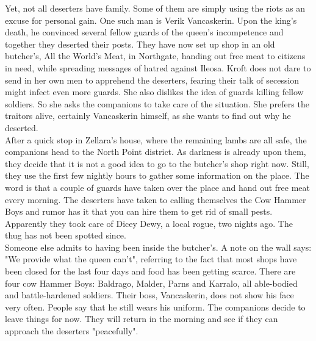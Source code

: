 Yet, not all deserters have family. Some of them are simply using the riots as an excuse for personal gain. One such man is Verik Vancaskerin. Upon the king's death, he convinced several fellow guards of the queen's incompetence and together they deserted their posts. They have now set up shop in an old butcher's, All the World's Meat, in Northgate, handing out free meat to citizens in need, while spreading messages of hatred against Ileosa. Kroft does not dare to send in her own men to apprehend the deserters, fearing their talk of secession might infect even more guards. She also dislikes the idea of guards killing fellow soldiers. So she asks the companions to take care of the situation. She prefers the traitors alive, certainly Vancaskerin himself, as she wants to find out why he deserted.\\

After a quick stop in Zellara's house, where the remaining lambs are all safe, the companions head to the North Point district. As darkness is already upon them, they decide that it is not a good idea to go to the butcher's shop right now. Still, they use the first few nightly hours to gather some information on the place. The word is that a couple of guards have taken over the place and hand out free meat every morning. The deserters have taken to calling themselves the Cow Hammer Boys and rumor has it that you can hire them to get rid of small pests. Apparently they took care of Dicey Dewy, a local rogue, two nights ago. The thug has not been spotted since.\\

Someone else admits to having been inside the butcher's. A note on the wall says: "We provide what the queen can't", referring to the fact that most shops have been closed for the last four days and food has been getting scarce. There are four cow Hammer Boys: Baldrago, Malder, Parns and Karralo, all able-bodied and battle-hardened soldiers. Their boss, Vancaskerin, does not show his face very often. People say that he still wears his uniform. The companions decide to leave things for now. They will return in the morning and see if they can approach the deserters "peacefully".\\

